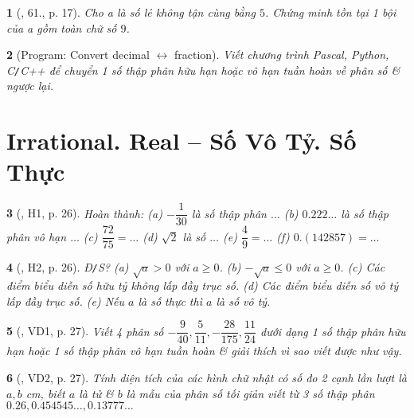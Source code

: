 \documentclass{article}
\newtheorem{baitoan}{}
\begin{document}
\begin{baitoan}[\cite{Binh_Toan_7_tap_1}, 61., p. 17]
	Cho a là số lẻ không tận cùng bằng $5$. Chứng minh tồn tại 1 bội của a gồm toàn chữ số $9$.
\end{baitoan}

\begin{baitoan}[{\sf Program}: Convert decimal $\leftrightarrow$ fraction]
	Viết chương trình {\sf Pascal, Python, C{\tt/}C++} để chuyển 1 số thập phân hữu hạn hoặc vô hạn tuần hoàn về phân số \& ngược lại.
\end{baitoan}


\section{Irrational. Real -- Số Vô Tỷ. Số Thực}

\begin{baitoan}[\cite{Binh_boi_duong_Toan_7_tap_1}, H1, p. 26]
	Hoàn thành: (a) $-\dfrac{1}{30}$ là số thập phân $\ldots$ (b) $0.222\ldots$ là số thập phân vô hạn $\ldots$ (c) $\dfrac{72}{75} = \ldots$ (d) $\sqrt{2}$ là số $\ldots$ (e) $\dfrac{4}{9} = \ldots$ (f) $0.(142857) = \ldots$
\end{baitoan}

\begin{baitoan}[\cite{Binh_boi_duong_Toan_7_tap_1}, H2, p. 26]
	{\rm Đ{\tt/}S?} (a) $\sqrt{a} > 0$ với $a\ge0$. (b) $-\sqrt{a}\le0$ với $a\ge0$. (c) Các điểm biểu diễn số hữu tỷ không lấp đầy trục số. (d) Các điểm biểu diễn số vô tỷ lấp đầy trục số. (e) Nếu $a$ là số thực thì $a$ là số vô tỷ.
\end{baitoan}

\begin{baitoan}[\cite{Binh_boi_duong_Toan_7_tap_1}, VD1, p. 27]
	Viết 4 phân số $-\dfrac{9}{40},\dfrac{5}{11},-\dfrac{28}{175},\dfrac{11}{24}$ dưới dạng 1 số thập phân hữu hạn hoặc 1 số thập phân vô hạn tuần hoàn \& giải thích vì sao viết được như vậy.
\end{baitoan}

\begin{baitoan}[\cite{Binh_boi_duong_Toan_7_tap_1}, VD2, p. 27]
	Tính diện tích của các hình chữ nhật có số đo 2 cạnh lần lượt là $a,b$ {\rm cm}, biết $a$ là tử \& $b$ là mẫu của {\rm phân số tối giản} viết từ 3 số thập phân $0.26,0.454545\ldots,0.13777\ldots$
\end{baitoan}
\end{document}
